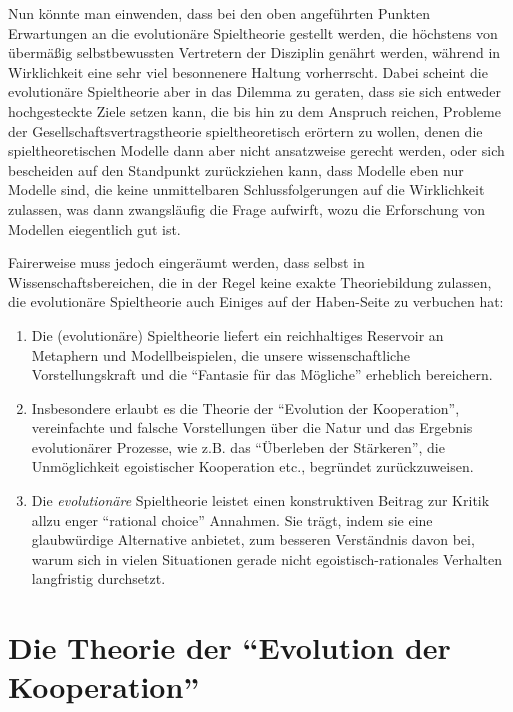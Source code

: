 \documentclass[12pt,a4paper,ngerman]{article}
\begin{document}
Nun könnte man einwenden, dass bei den oben angeführten Punkten
Erwartungen an die evolutionäre Spieltheorie gestellt werden, die
höchstens von übermäßig selbstbewussten Vertretern der Disziplin
genährt werden, während in Wirklichkeit eine sehr viel besonnenere
Haltung vorherrscht. Dabei scheint die evolutionäre Spieltheorie aber
in das Dilemma zu geraten, dass sie sich entweder hochgesteckte Ziele
setzen kann, die bis hin zu dem Anspruch reichen, Probleme der
Gesellschaftsvertragstheorie spieltheoretisch erörtern zu wollen,
denen die spieltheoretischen Modelle dann aber nicht ansatzweise
gerecht werden, oder sich bescheiden auf den Standpunkt zurückziehen
kann, dass Modelle eben nur Modelle sind, die keine unmittelbaren
Schlussfolgerungen auf die Wirklichkeit zulassen, was dann
zwangsläufig die Frage aufwirft, wozu die Erforschung von Modellen
eiegentlich gut ist.

Fairerweise muss jedoch eingeräumt werden, dass selbst in
Wissenschaftsbereichen, die in der Regel keine exakte Theoriebildung
zulassen, die evolutionäre Spieltheorie auch Einiges auf der Haben-Seite
zu verbuchen hat: 

\begin{enumerate} 

\item Die (evolutionäre) Spieltheorie 
liefert ein reichhaltiges Reservoir an Metaphern und Modellbeispielen,
die unsere wissenschaftliche Vorstellungskraft und die "`Fantasie für
das Mögliche"' erheblich bereichern.  

\item Insbesondere erlaubt es
die Theorie der "`Evolution der Kooperation"', vereinfachte und
falsche Vorstellungen über die Natur und das Ergebnis evolutionärer
Prozesse, wie z.B. das "`Überleben der Stärkeren"', die Unmöglichkeit
egoistischer Kooperation etc., begründet zurückzuweisen.

\item Die {\em evolutionäre} Spieltheorie leistet einen konstruktiven Beitrag zur
Kritik allzu enger "`rational choice"' Annahmen. Sie trägt, indem sie eine
glaubwürdige Alternative anbietet, zum besseren Verständnis
davon bei, warum sich in vielen Situationen gerade nicht egoistisch-rationales
Verhalten langfristig durchsetzt.

\end{enumerate} 


\section{Die Theorie der "`Evolution der Kooperation"'}
\end{document}
